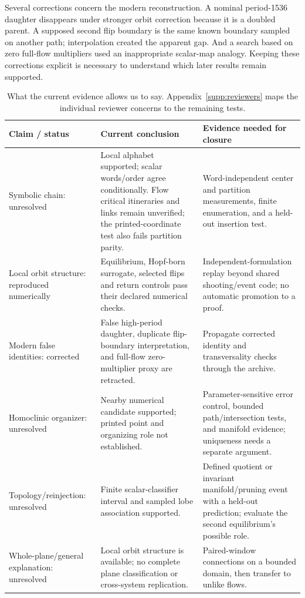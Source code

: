 Several corrections concern the modern reconstruction. A nominal
period-1536 daughter disappears under stronger orbit correction because it
is a doubled parent. A supposed second flip boundary is the same known
boundary sampled on another path; interpolation created the apparent gap.
And a search based on zero full-flow multipliers used an inappropriate
scalar-map analogy. Keeping these corrections explicit is necessary to
understand which later results remain supported.

\begin{table}[tbp]
\centering
\small
\renewcommand{\arraystretch}{1.25}
\begin{tabularx}{\textwidth}{@{}P{0.20\textwidth}P{0.37\textwidth}>{\raggedright\arraybackslash}X@{}}
\toprule
Claim / status & Current conclusion & Evidence needed for closure \\
\midrule
Symbolic chain: unresolved &
Local alphabet supported; scalar words/order agree conditionally.
Flow critical itineraries and links remain unverified; the printed-coordinate
test also fails partition parity. &
Word-independent center and partition measurements, finite enumeration,
and a held-out insertion test. \\
Local orbit structure: reproduced numerically &
Equilibrium, Hopf-born surrogate, selected flips and return controls pass
their declared numerical checks. &
Independent-formulation replay beyond shared shooting/event code; no
automatic promotion to a proof. \\
Modern false identities: corrected &
False high-period daughter, duplicate flip-boundary interpretation, and
full-flow zero-multiplier proxy are retracted. &
Propagate corrected identity and transversality checks through the archive. \\
Homoclinic organizer: unresolved &
Nearby numerical candidate supported; printed point and organizing role
not established. &
Parameter-sensitive error control, bounded path/intersection tests, and
manifold evidence; uniqueness needs a separate argument. \\
Topology/reinjection: unresolved &
Finite scalar-classifier interval and sampled lobe association supported. &
Defined quotient or invariant manifold/pruning event with a held-out
prediction; evaluate the second equilibrium's possible role. \\
Whole-plane/general explanation: unresolved &
Local orbit structure is available; no complete plane classification or
cross-system replication. &
Paired-window connections on a bounded domain, then transfer to unlike flows. \\
\bottomrule
\end{tabularx}
\caption{What the current evidence allows us to say.
Appendix~\ref{supp:reviewers} maps the individual reviewer concerns to the
remaining tests.}
\label{tab:current-claims}
\end{table}

